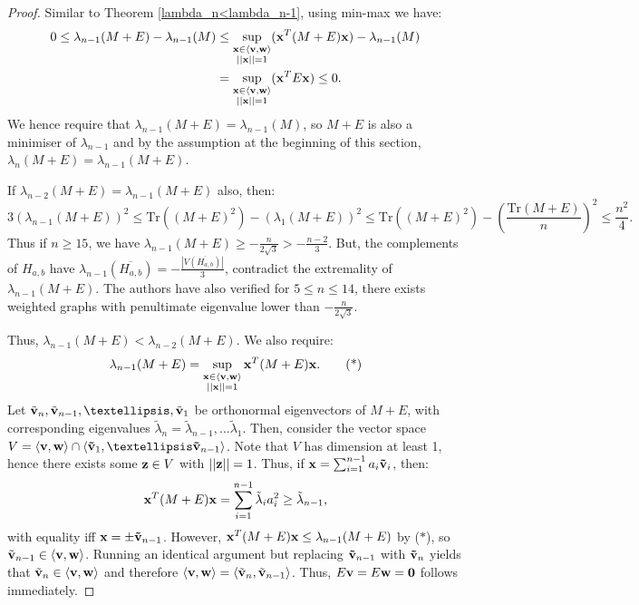 \documentclass[12pt]{article}
\begin{document}
\begin{proof} Similar to Theorem \ref{lambda_n<lambda_n-1}, using min-max we have:
\begin{align*}
    0\le \lambda_{n-1}(M+E) - \lambda_{n-1}(M) & \le \sup_{\substack{\bold{x} \in \braket{\bold{v},\bold{w}}\\ ||\bold{x}|| = 1}} (\bold{x}^T(M+E)\bold{x}) - \lambda_{n-1}(M) \\ & = \sup_{\substack{\bold{x} \in \braket{\bold{v},\bold{w}}\\ ||\bold{x}|| = 1}} (\bold{x}^TE\bold{x}) \le 0.
\end{align*}
We hence require that $\lambda_{n-1}(M+E) = \lambda_{n-1}(M)$, so $M+E$ is also a minimiser of $\lambda_{n-1}$ and by the assumption at the beginning of this section, $\lambda_{n}(M+E) = \lambda_{n-1}(M+E)$. 

If $\lambda_{n-2}(M+E)=\lambda_{n-1}(M+E)$ also, then:
\begin{equation*}
    3(\lambda_{n-1}(M+E))^2 \le \text{Tr}((M+E)^2) - (\lambda_1(M+E))^2 \le \text{Tr}((M+E)^2) - \left(\frac{\text{Tr}(M+E)}{n}\right)^2 \le \frac{n^2}{4}.
\end{equation*}
Thus if $n\ge 15$, we have $\lambda_{n-1}(M+E) \ge - \frac{n}{2\sqrt{3}}> - \frac{n-2}{3}$. But, the complements of $H_{a,b}$ have $\lambda_{n-1}(\overline{H_{a,b}}) = -\frac{|V(\overline{H_{a,b}})|}{3}$, contradict the extremality of $\lambda_{n-1}(M+E)$. The authors have also verified for $5\le n\le 14$, there exists weighted graphs with penultimate eigenvalue lower than $-\frac{n}{2\sqrt{3}}$. 

Thus, $\lambda_{n-1}(M+E)< \lambda_{n-2}(M+E)$.
We also require:
\begin{equation*}
    \lambda_{n-1}(M+E) = \sup_{\substack{\bold{x} \in \braket{\bold{v},\bold{w}}\\||\bold{x}|| = 1}}\bold{x}^T (M+E)\bold{x}. \tag{*}
\end{equation*}
Let $\tilde{\bold{v}}_n, \tilde{\bold{v}}_{n-1},\dots ,\tilde{\bold{v}}_1$ be orthonormal eigenvectors of $M+E$, with corresponding eigenvalues $\tilde{\lambda}_n = \tilde{\lambda}_{n-1}, \dots \tilde{\lambda}_1$. Then, consider the vector space $V = \braket{\bold{v,w}}\cap \braket{\bold{\tilde{v}}_1,\dots \bold{\tilde{v}}_{n-1}}$. Note that $V$ has dimension at least 1, hence there exists some $\bold{z}\in V$ with $||\bold{z}||=1$. Thus, if $\bold{x} = \sum_{i=1}^{n-1} a_i \bold{\tilde{v}}_i$, then:
\begin{equation*} \bold{x}^{T}(M+E)\bold{x} =  \sum_{i=1}^{n-1} \tilde{\lambda}_{i}a_i^2 \ge \tilde{\lambda}_{n-1},
\end{equation*}
with equality iff $\bold{x} = \pm \bold{\tilde{v}}_{n-1}$. However, $\bold{x}^{T}(M+E)\bold{x} \le {\lambda}_{n-1}(M+E)$ by ($*$), so $\tilde{\bold{v}}_{n-1} \in \braket{\bold{v,w}}$. Running an identical argument but replacing $\bold{\tilde{v}}_{n-1}$ with $\bold{\tilde{v}}_n$ yields that $\tilde{\bold{v}}_{n} \in \braket{\bold{v,w}}$ and therefore $\braket{\bold{v,w}} = \braket{\tilde{\bold{v}}_{n},\tilde{\bold{v}}_{n-1}}$. Thus, $E\bold{v}=E\bold{w} = \bold{0}$ follows immediately. 
\end{proof}
\end{document}
